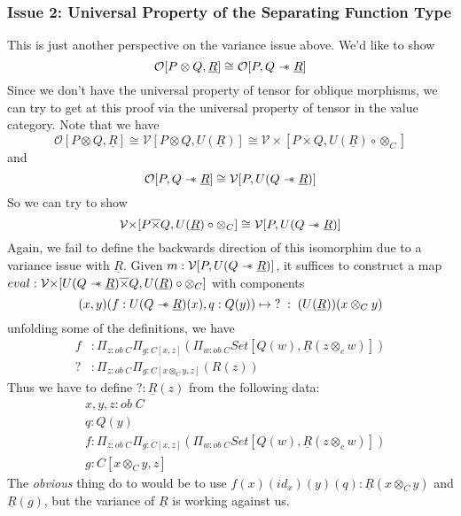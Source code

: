 \documentclass{article}
\newcommand{\sep}{\mathrel{-\mkern-6mu*}}
\begin{document}
\subsubsection{Issue 2: Universal Property of the Separating Function Type}
This is just another perspective on the variance issue above. We'd like to show
\[
    \mathcal{O}[P \otimes Q , \underline{R}] \cong \mathcal{O}[P , Q \sep \underline{R}]    
\]
Since we don't have the universal property of tensor for oblique morphisms, we can try to get at this proof via the 
universal property of tensor in the value category. Note that we have
\[
    \mathcal{O}[P \otimes Q , \underline{R}] \cong \mathcal{V}[P \otimes Q , U(\underline{R})] \cong \mathcal{V\times}[P \overline{\times} Q , U(\underline{R}) \circ \otimes_C] 
\]
and 
\[
    \mathcal{O}[P , Q \sep \underline{R}] \cong \mathcal{V}[P , U(Q \sep \underline{R})]
\]
So we can try to show 
\[
    \mathcal{V\times}[P \overline{\times} Q , U(\underline{R}) \circ \otimes_C] \cong \mathcal{V}[P , U(Q \sep \underline{R})]
\]
Again, we fail to define the backwards direction of this isomorphim due to a variance issue with $\underline{R}$. 
Given $m : \mathcal{V}[P , U(Q \sep \underline{R})]$, it suffices to construct a map 
$eval : \mathcal{V\times}[ U(Q \sep \underline{R}) \overline{\times} Q , U(\underline{R}) \circ \otimes_C] $ with components 
\[
    (x , y)(f : U(Q \sep \underline{R})(x), q : Q(y)) \mapsto \;? \;: \;  (U(\underline{R}))(x \otimes_C y)    
\]
unfolding some of the definitions, we have 
\begin{align*}
    f &: \Pi_{z : ob \;C}\Pi_{g : C[x , z]}(\Pi_{w : ob \; C}Set[Q(w), \underline{R}(z \otimes_c w)])\\
    ? &: \Pi_{z : ob \;C}\Pi_{g : C[x \otimes_C y, z]}(R(z))
\end{align*}
Thus we have to define $? : \underline{R}(z)$ from the following data:
\begin{align*}
    &x,y,z : ob \;C \\
    &q : Q(y)\\
    &f : \Pi_{z : ob \;C}\Pi_{g : C[x , z]}(\Pi_{w : ob \; C}Set[Q(w), \underline{R}(z \otimes_c w)])\\
    &g : C[x\otimes_C y , z]
\end{align*}
The \textit{obvious} thing do to would be to use $f (x)(id_x)(y)(q) : \underline{R}(x \otimes_C y)$ and $\underline{R}(g)$, 
but the variance of $\underline{R}$ is working against us.
\end{document}
